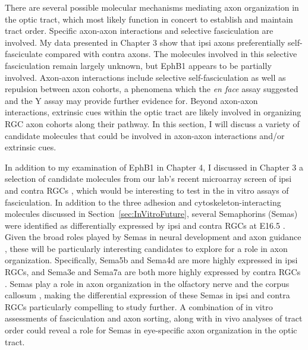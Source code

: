 There are several possible molecular mechanisms mediating axon organization in the optic tract, which most likely function in concert to establish and maintain tract order.
Specific axon-axon interactions and selective fasciculation are involved.
My data presented in Chapter 3 show that ipsi axons preferentially self-fasciculate compared with contra axons.
The molecules involved in this selective fasciculation remain largely unknown, but EphB1 appears to be partially involved.
Axon-axon interactions include selective self-fasciculation as well as repulsion between axon cohorts, a phenomena which the \emph{en face} assay suggested and the Y assay may provide further evidence for.
Beyond axon-axon interactions, extrinsic cues within the optic tract are likely involved in organizing RGC axon cohorts along their pathway.
In this section, I will discuss a variety of candidate molecules that could be involved in axon-axon interactions and/or extrinsic cues.

In addition to my examination of EphB1 in Chapter 4, I discussed in Chapter 3 a selection of candidate molecules from our lab's recent microarray screen of ipsi and contra RGCs \cite{wang2016ipsilateral}, which would be interesting to test in the in vitro assays of fasciculation.
In addition to the three adhesion and cytoskeleton-interacting molecules discussed in Section~\ref{sec:InVitroFuture}, several Semaphorins (Semas) were identified as differentially expressed by ipsi and contra RGCs at E16.5 \cite{wang2016ipsilateral}.
Given the broad roles played by Semas in neural development and axon guidance \cite{raper2000semaphorins}, these will be particularly interesting candidates to explore for a role in axon organization.
Specifically, Sema5b and Sema4d are more highly expressed in ipsi RGCs, and Sema3e and Sema7a are both more highly expressed by contra RGCs \cite{wang2016ipsilateral}.
Semas play a role in axon organization in the olfactory nerve \cite{imai2009pre} and the corpus callosum \cite{zhou2013axon}, making the differential expression of these Semas in ipsi and contra RGCs particularly compelling to study further.
A combination of in vitro assessments of fasciculation and axon sorting, along with in vivo analyses of tract order could reveal a role for Semas in eye-specific axon organization in the optic tract.

